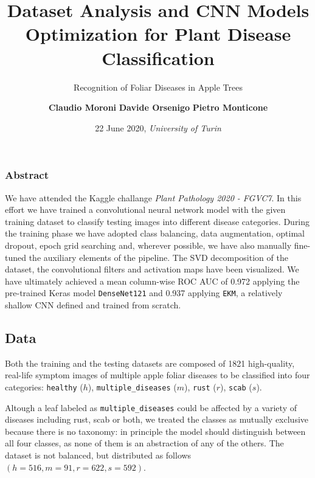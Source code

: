 \documentclass[]{article}
\title{Dataset Analysis and CNN Models Optimization for Plant Disease
Classification}
\subtitle{Recognition of Foliar Diseases in Apple Trees}
\author{\textbf{Claudio Moroni} \textbar{} \textbf{Davide Orsenigo} \textbar{}
\textbf{Pietro Monticone}}
\date{22 June 2020, \emph{University of Turin}}
\begin{document}
\maketitle

\hypertarget{abstract}{%
\subsubsection{\texorpdfstring{\textbf{Abstract}}{Abstract}}\label{abstract}}

We have attended the Kaggle challange \emph{Plant Pathology 2020 -
FGVC7}. In this effort we have trained a convolutional neural network
model with the given training dataset to classify testing images into
different disease categories. During the training phase we have adopted
class balancing, data augmentation, optimal dropout, epoch grid
searching and, wherever possible, we have also manually fine-tuned the
auxiliary elements of the pipeline. The SVD decomposition of the
dataset, the convolutional filters and activation maps have been
visualized. We have ultimately achieved a mean column-wise ROC AUC of
0.972 applying the pre-trained Keras model \texttt{DenseNet121} and
0.937 applying \texttt{EKM}, a relatively shallow CNN defined and
trained from scratch.

\hypertarget{data}{%
\subsection{\texorpdfstring{\textbf{Data}}{Data}}\label{data}}

Both the training and the testing datasets are composed of 1821
high-quality, real-life symptom images of multiple apple foliar diseases
to be classified into four categories: \texttt{healthy} (\(h\)),
\texttt{multiple\_diseases} (\(m\)), \texttt{rust} (\(r\)),
\texttt{scab} (\(s\)).

Altough a leaf labeled as \texttt{multiple\_diseases} could be affected
by a variety of diseases including rust, scab or both, we treated the
classes as mutually exclusive because there is no taxonomy: in principle
the model should distinguish between all four classes, as none of them
is an abstraction of any of the others. The dataset is not balanced, but
distributed as follows \((h = 516, m = 91, r = 622, s = 592)\).
\end{document}
